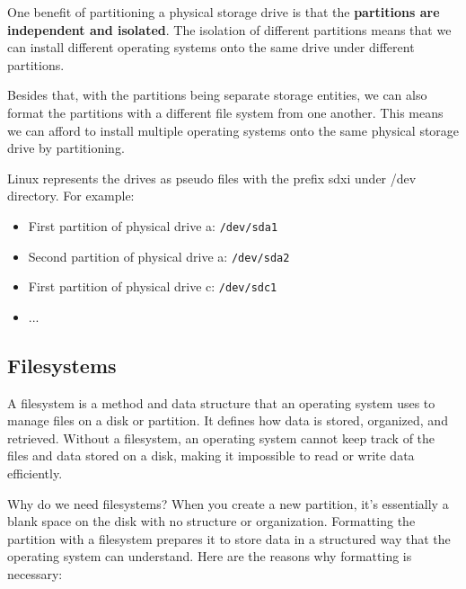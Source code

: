 \documentclass{article}
\begin{document}
One benefit of partitioning a physical storage drive is that the \textbf{partitions are independent and isolated}. The isolation of different partitions means that we can install different operating systems onto the same drive under different partitions.

Besides that, with the partitions being separate storage entities, we can also format the partitions with a different file system from one another. This means we can afford to install multiple operating systems onto the same physical storage drive by partitioning.

Linux represents the drives as pseudo files with the prefix sdxi under /dev directory. For example:
\begin{itemize}
    \item First partition of physical drive a: \verb|/dev/sda1|
    \item Second partition of physical drive a: \verb|/dev/sda2|
    \item First partition of physical drive c: \verb|/dev/sdc1|
    \item ...
\end{itemize}

\subsection{Filesystems}
A filesystem is a method and data structure that an operating system uses to manage files on a disk or partition. It defines how data is stored, organized, and retrieved. Without a filesystem, an operating system cannot keep track of the files and data stored on a disk, making it impossible to read or write data efficiently.

Why do we need filesystems? When you create a new partition, it's essentially a blank space on the disk with no structure or organization. Formatting the partition with a filesystem prepares it to store data in a structured way that the operating system can understand. Here are the reasons why formatting is necessary:
\end{document}

